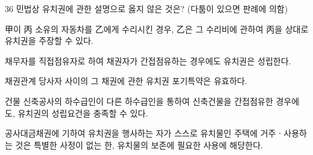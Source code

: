 \begin{question}{36}
민법상 유치권에 관한 설명으로 옳지 않은 것은? (다툼이 있으면 판례에 의함)
\begin{choices}
  \item 甲이 丙 소유의 자동차를 乙에게 수리시킨 경우, 乙은 그 수리비에 관하여 丙을 상대로 유치권을 주장할 수 있다.
  \item 채무자를 직접점유자로 하여 채권자가 간접점유하는 경우에도 유치권은 성립한다.
  \item 채권관계 당사자 사이의 그 채권에 관한 유치권 포기특약은 유효하다.
  \item 건물 신축공사의 하수급인이 다른 하수급인을 통하여 신축건물을 간접점유한 경우에도, 유치권의 성립요건을 충족할 수 있다.
  \item 공사대금채권에 기하여 유치권을 행사하는 자가 스스로 유치물인 주택에 거주ㆍ사용하는 것은 특별한 사정이 없는 한, 유치물의 보존에 필요한 사용에 해당한다.
\end{choices}
\end{question}
